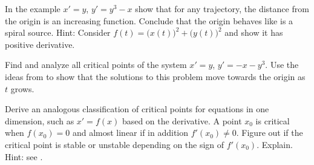 \documentclass{ximera}
\begin{document}
\begin{exercise} \label{exercise:increasing}
In the example $x'=y$, $y'=y^3-x$ show that for any trajectory, the distance from the origin is an increasing function. Conclude that the origin behaves like is a spiral source. Hint: Consider 
$f(t) = {\bigl(x(t)\bigr)}^2 + {\bigl(y(t)\bigr)}^2$ 
and show it has positive derivative.
\end{exercise}

\begin{exercise}
    Find and analyze all critical points of the system $x' = y$, $y' = -x - y^3$. Use the ideas from  to show that the solutions to this problem move towards the origin as $t$ grows.
\end{exercise}

\begin{exercise}%
    Derive an analogous classification of critical points for equations in one dimension, such as $x'= f(x)$ based on the derivative.  A point $x_0$ is critical when $f(x_0) = 0$ and almost linear if in addition $f'(x_0) \not= 0$.  Figure out if the critical point is stable or unstable depending on the sign of $f'(x_0)$.  Explain.  Hint: see .
\end{exercise}

%
\end{document}
